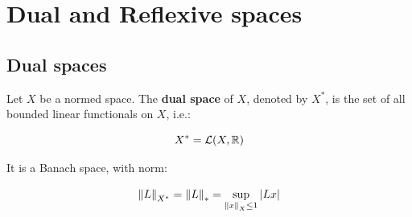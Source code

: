 \chapter{Dual and Reflexive spaces}

\section{Dual spaces}

\begin{fdefinition}
    Let $X$ be a normed space. The \textbf{dual space} of $X$, denoted by 
    $X^*$, is the set of all bounded linear functionals on $X$, i.e.:

    $$X^* = \mathcal{L}(X, \mathbb{R})$$

    It is a Banach space, with norm:

    $$\left\|L\right\|_{X^*} = \left\|L\right\|_* = \sup_{\left\|x\right\|_X \leq 1} |Lx|$$
\end{fdefinition}

